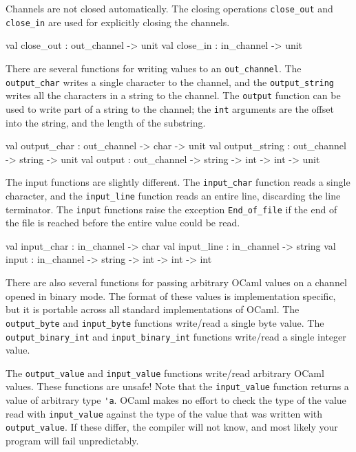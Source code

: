 Channels are not closed automatically.  The closing operations \hbox{\lstinline/close_out/}
and \hbox{\lstinline/close_in/} are used for explicitly closing the channels.

\begin{ocaml}
val close_out : out_channel -> unit
val close_in : in_channel -> unit
\end{ocaml}


There are several functions for writing values to
an \hbox{\lstinline/out_channel/}. The \hbox{\lstinline/output_char/} writes a single character to
the channel, and the \hbox{\lstinline/output_string/} writes all the characters in a string to the
channel. The \hbox{\lstinline/output/} function can be used to write part of a string to the
channel; the \hbox{\lstinline$int$} arguments are the offset into the string, and the length of the
substring.

\begin{ocaml}
val output_char : out_channel -> char -> unit
val output_string : out_channel -> string -> unit
val output : out_channel -> string -> int -> int -> unit
\end{ocaml}
%
The input functions are slightly different. The \hbox{\lstinline/input_char/} function reads a
single character, and the \hbox{\lstinline/input_line/} function reads an entire line, discarding
the line terminator. The \hbox{\lstinline$input$} functions raise the
exception \hbox{\lstinline/End_of_file/} if the end of the file is reached before the entire value
could be read.

\begin{ocaml}
val input_char : in_channel -> char
val input_line : in_channel -> string
val input : in_channel -> string -> int -> int -> int
\end{ocaml}
%
There are also several functions for passing arbitrary OCaml values on a channel opened in binary
mode. The format of these values is implementation specific, but it is portable across all standard
implementations of OCaml. The \hbox{\lstinline/output_byte/} and \hbox{\lstinline/input_byte/}
functions write/read a single byte value. The \hbox{\lstinline/output_binary_int/}
and \hbox{\lstinline$input_binary_int$} functions write/read a single integer value.

The \hbox{\lstinline/output_value/} and \hbox{\lstinline/input_value/} functions write/read
arbitrary OCaml values.  These functions are unsafe!  Note that the \hbox{\lstinline/input_value/}
function returns a value of arbitrary type \hbox{\lstinline/'a/}. OCaml makes no effort to check the
type of the value read with \hbox{\lstinline/input_value/} against the type of the value that was
written with \hbox{\lstinline/output_value/}. If these differ, the compiler will not know, and most
likely your program will fail unpredictably.

